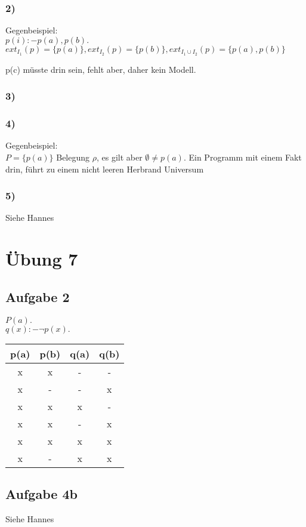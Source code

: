 \documentclass[12pt, a4paper]{article}
\begin{document}
\subsubsection*{2)}
Gegenbeispiel: \\
$p(i) :- p(a), p(b).$ \\
$ext_{I_1}(p) = \{ p(a)\}, ext_{I_2}(p) = \{ p(b) \}, ext_{I_1 \cup I_2}(p) = \{ p(a), p(b) \}$

p(c) müsste drin sein, fehlt aber, daher kein Modell.

\subsubsection*{3)}
\checkmark

\subsubsection*{4)}
Gegenbeispiel: \\
$P = \{ p(a) \}$ Belegung $\rho$, es gilt aber $\emptyset \neq p(a)$.
Ein Programm mit einem Fakt drin, führt zu einem nicht leeren Herbrand Universum

\subsubsection*{5)}
Siehe Hannes


\section*{Übung 7}

\subsection*{Aufgabe 2}
$P(a).$ \\
$q(x) :- \lnot p(x).$ \\
\begin{tabular}{|c|c|c|c|}
\hline
p(a) & p(b) & q(a) & q(b) \\ \hline
x & x & - & -\\
x & - & - & x\\
x & x & x & -\\
x & x & - & x\\
x & x & x & x\\
x & - & x & x\\
\hline
\end{tabular}

\subsection*{Aufgabe 4b}
Siehe Hannes
\end{document}
